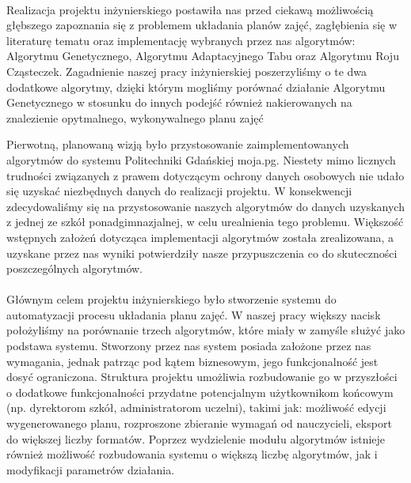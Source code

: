 \paragraph{}
\par Realizacja projektu inżynierskiego postawiła nas przed ciekawą możliwością głębszego zapoznania się z problemem układania planów zajęć, zagłębienia się w literaturę tematu oraz implementację wybranych przez nas algorytmów: Algorytmu Genetycznego, Algorytmu Adaptacyjnego Tabu oraz Algorytmu Roju Cząsteczek. Zagadnienie naszej pracy inżynierskiej poszerzyliśmy o te dwa dodatkowe algorytmy, dzięki którym mogliśmy porównać działanie Algorytmu Genetycznego w stosunku do innych podejść również nakierowanych na znalezienie opytmalnego, wykonywalnego planu zajęć
\par Pierwotną, planowaną wizją było przystosowanie zaimplementowanych algorytmów do systemu Politechniki Gdańskiej moja.pg. Niestety mimo licznych trudności związanych z prawem dotyczącym ochrony danych osobowych nie udało się uzyskać niezbędnych danych do realizacji projektu. W konsekwencji zdecydowaliśmy się na przystosowanie naszych algorytmów do danych uzyskanych z jednej ze szkół ponadgimnazjalnej, w celu urealnienia tego problemu. Większość wstępnych założeń dotycząca implementacji algorytmów została zrealizowana, a uzyskane przez nas wyniki potwierdziły nasze przypuszczenia co do skuteczności poszczególnych algorytmów. 
\paragraph{}Głównym celem projektu inżynierskiego było stworzenie systemu do automatyzacji procesu układania planu zajęć. W naszej pracy większy nacisk położyliśmy na porównanie trzech algorytmów, które miały w zamyśle służyć jako podstawa systemu. Stworzony przez nas system posiada założone przez nas wymagania, jednak patrząc pod kątem biznesowym, jego funkcjonalność jest dosyć ograniczona. Struktura projektu umożliwia rozbudowanie go w przyszłości o dodatkowe funkcjonalności przydatne potencjalnym użytkownikom końcowym (np. dyrektorom szkół, administratorom uczelni), takimi jak: możliwość edycji wygenerowanego planu, rozproszone zbieranie wymagań od nauczycieli, eksport do większej liczby formatów. Poprzez wydzielenie modułu algorytmów istnieje również możliwość rozbudowania systemu o większą liczbę algorytmów, jak i modyfikacji parametrów działania. 

